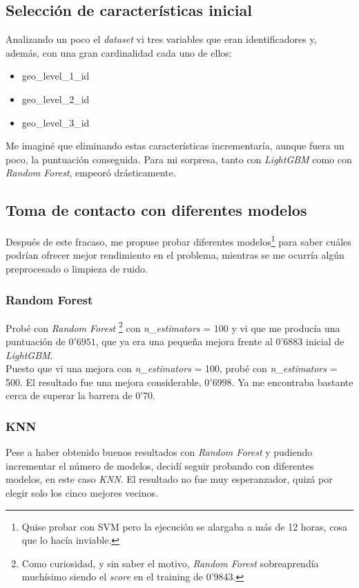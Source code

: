 \documentclass[paper=a4, fontsize=12pt]{article} %
\numberwithin{equation}{section} %
\numberwithin{figure}{section} %
\numberwithin{table}{section} %
\begin{document}
\subsection{Selección de características inicial}
Analizando un poco el \textit{dataset} vi tres variables que eran identificadores y, además, con una gran cardinalidad cada uno de ellos:

\begin{itemize}
\item geo\_level\_1\_id
\item geo\_level\_2\_id
\item geo\_level\_3\_id
\end{itemize}

Me imaginé que eliminando estas características incrementaría, aunque fuera un poco, la puntuación conseguida. Para mi sorpresa, tanto con \textit{LightGBM} como con \textit{Random Forest}, empeoró drásticamente. \\

\subsection{Toma de contacto con diferentes modelos}
Después de este fracaso, me propuse probar diferentes modelos\footnote{Quise probar con SVM pero la ejecución se alargaba a más de 12 horas, cosa que lo hacía inviable.} para saber cuáles podrían ofrecer mejor rendimiento en el problema, mientras se me ocurría algún preprocesado o limpieza de ruido. 

\subsubsection{Random Forest}
Probé con \textit{Random Forest} \footnote{Como curiosidad, y sin saber el motivo, \textit{Random Forest} sobreaprendía muchísimo siendo el \textit{score} en el training de 0'9843.} con \textit{n\_estimators} = 100 y vi que me producía una puntuación de $0'6951$, que ya era una pequeña mejora frente al 0'6883 inicial de \textit{LightGBM}. \\

Puesto que vi una mejora con \textit{n\_estimators} = 100, probé con \textit{n\_estimators} = 500. El resultado fue una mejora considerable, $0'6998$. Ya me encontraba bastante cerca de superar la barrera de 0'70.

\subsubsection{KNN}
Pese a haber obtenido buenos resultados con \textit{Random Forest} y pudiendo incrementar el número de modelos, decidí seguir probando con diferentes modelos, en este caso \textit{KNN}. El resultado no fue muy esperanzador, quizá por elegir solo los cinco mejores vecinos.
\end{document}
